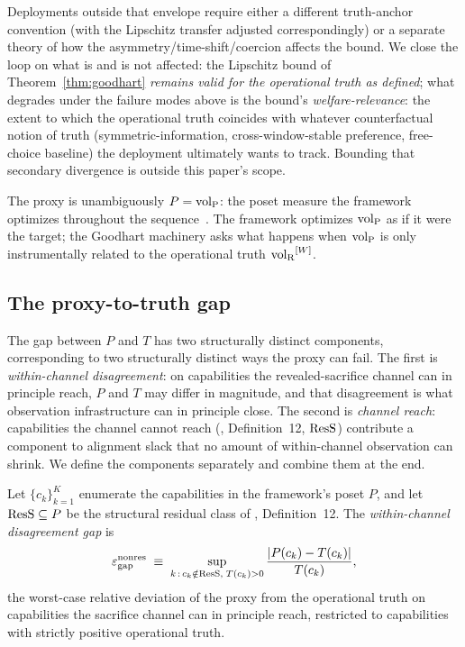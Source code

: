 \begin{remark}
Deployments outside that envelope require either a different
truth-anchor convention (with the Lipschitz transfer adjusted
correspondingly) or a separate theory of how the
asymmetry/time-shift/coercion affects the bound.  We close the
loop on what is and is not affected: the Lipschitz bound of
Theorem~\ref{thm:goodhart} \emph{remains valid for the
operational truth as defined}; what degrades under the failure
modes above is the bound's \emph{welfare-relevance}: the
extent to which the operational truth coincides with whatever
counterfactual notion of truth (symmetric-information,
cross-window-stable preference, free-choice baseline) the
deployment ultimately wants to track.  Bounding that secondary
divergence is outside this paper's scope.
\end{remark}

The proxy is unambiguously $P = {\operatorname{vol}_{\mathrm{P}}}$: the poset measure the
framework optimizes throughout the
sequence~\citep[Definition~6]{lasser2026gfm}.  The framework
optimizes ${\operatorname{vol}_{\mathrm{P}}}$ as if it were the target; the Goodhart machinery
asks what happens when ${\operatorname{vol}_{\mathrm{P}}}$ is only instrumentally related to
the operational truth ${\operatorname{vol}_{\mathrm{R}}}^{[W]}$.

\subsection{The proxy-to-truth gap}
\label{sec:goodhart_gap}

The gap between $P$ and $T$ has two structurally distinct
components, corresponding to two structurally distinct ways the
proxy can fail.  The first is \emph{within-channel disagreement}: on
capabilities the revealed-sacrifice channel can in principle reach,
$P$ and $T$ may differ in magnitude, and that disagreement is what
observation infrastructure can in principle close.  The second is
\emph{channel reach}: capabilities the channel cannot reach
(\citep[Need~Sufficiency]{lasser2026paper8b}, Definition~12,
$\mathrm{ResS}$) contribute a component to alignment slack that no amount
of within-channel observation can shrink.  We define the components
separately and combine them at the end.

\begin{definition}
\label{def:eps_nonres}
Let $\{c_k\}_{k=1}^K$ enumerate the capabilities in the framework's
poset $P$, and let $\mathrm{ResS} \subseteq P$ be the structural residual
class of \citep[Need~Sufficiency]{lasser2026paper8b}, Definition~12.
The \emph{within-channel disagreement gap} is
\[
  \varepsilon_{\mathrm{gap}}^{\mathrm{nonres}} \;\equiv\; \sup_{k \,:\, c_k \notin \mathrm{ResS},\; T(c_k) > 0}
  \frac{|P(c_k) - T(c_k)|}{T(c_k)},
\]
the worst-case relative deviation of the proxy from the operational
truth on capabilities the sacrifice channel can in principle reach,
restricted to capabilities with strictly positive operational truth.
\end{definition}

